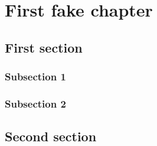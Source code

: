 
\chapter{First fake chapter\label{chap:chap1_fake}}
\minitoc

\section{First section}

\subsection{Subsection 1}

\lipsum[1-10]

\subsection{Subsection 2}

\lipsum[1-10]

\section{Second section}

\lipsum[1-10]

